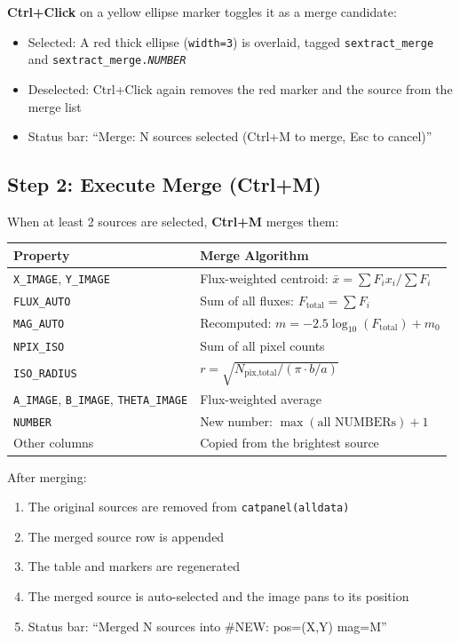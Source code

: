 \documentclass[11pt,fleqn]{book}
\begin{document}
\textbf{Ctrl+Click} on a yellow ellipse marker toggles it as a merge candidate:
\begin{itemize}[leftmargin=2em]
  \item Selected: A red thick ellipse (\texttt{width=3}) is overlaid, tagged \texttt{sextract\_merge} and \texttt{sextract\_merge.\textit{NUMBER}}
  \item Deselected: Ctrl+Click again removes the red marker and the source from the merge list
  \item Status bar: ``Merge: N sources selected (Ctrl+M to merge, Esc to cancel)''
\end{itemize}

\subsection{Step 2: Execute Merge (Ctrl+M)}

When at least 2 sources are selected, \textbf{Ctrl+M} merges them:

\begin{center}
\begin{longtable}{L{3.2cm} L{9.3cm}}
\toprule
\textbf{Property} & \textbf{Merge Algorithm} \\
\midrule
\endhead
\texttt{X\_IMAGE}, \texttt{Y\_IMAGE} & Flux-weighted centroid: $\bar{x} = \sum F_i x_i / \sum F_i$ \\
\midrule
\texttt{FLUX\_AUTO} & Sum of all fluxes: $F_{\text{total}} = \sum F_i$ \\
\midrule
\texttt{MAG\_AUTO} & Recomputed: $m = -2.5\log_{10}(F_{\text{total}}) + m_0$ \\
\midrule
\texttt{NPIX\_ISO} & Sum of all pixel counts \\
\midrule
\texttt{ISO\_RADIUS} & $r = \sqrt{N_{\text{pix,total}} / (\pi \cdot b/a)}$ \\
\midrule
\texttt{A\_IMAGE}, \texttt{B\_IMAGE}, \texttt{THETA\_IMAGE} & Flux-weighted average \\
\midrule
\texttt{NUMBER} & New number: $\max(\text{all NUMBERs}) + 1$ \\
\midrule
Other columns & Copied from the brightest source \\
\bottomrule
\end{longtable}
\end{center}

After merging:
\begin{enumerate}[leftmargin=2em]
  \item The original sources are removed from \texttt{catpanel(alldata)}
  \item The merged source row is appended
  \item The table and markers are regenerated
  \item The merged source is auto-selected and the image pans to its position
  \item Status bar: ``Merged N sources into \#NEW: pos=(X,Y) mag=M''
\end{enumerate}
\end{document}
